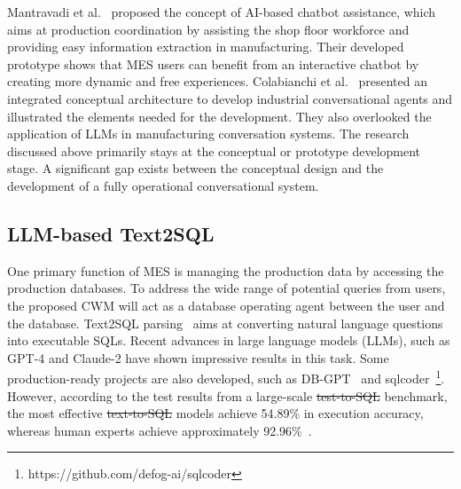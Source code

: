 \documentclass[preprint,12pt]{elsarticle}
\providecommand{\DIFaddtex}[1]{{\protect\color{blue}\uwave{#1}}} %
\providecommand{\DIFdeltex}[1]{{\protect\color{red}\sout{#1}}}                      %
\providecommand{\DIFaddbegin}{} %
\providecommand{\DIFaddend}{} %
\providecommand{\DIFdelbegin}{} %
\providecommand{\DIFdelend}{} %
\providecommand{\DIFadd}[1]{\texorpdfstring{\DIFaddtex{#1}}{#1}} %
\providecommand{\DIFdel}[1]{\texorpdfstring{\DIFdeltex{#1}}{}} %
\newcommand{\DIFscaledelfig}{0.5}
\newlength{\DIFdelgraphicswidth} %
\newlength{\DIFdelgraphicsheight} %
\newcommand{\DIFaddincludegraphics}[2][]{{\color{blue}\fbox{\DIFOincludegraphics[#1]{#2}}}} %
\newcommand{\DIFdelincludegraphics}[2][]{%
\sbox{\DIFdelgraphicsbox}{\DIFOincludegraphics[#1]{#2}}%
\settoboxwidth{\DIFdelgraphicswidth}{\DIFdelgraphicsbox} %
\settoboxtotalheight{\DIFdelgraphicsheight}{\DIFdelgraphicsbox} %
\scalebox{\DIFscaledelfig}{%
\parbox[b]{\DIFdelgraphicswidth}{\usebox{\DIFdelgraphicsbox}\\[-\baselineskip] \rule{\DIFdelgraphicswidth}{0em}}\llap{\resizebox{\DIFdelgraphicswidth}{\DIFdelgraphicsheight}{%
\setlength{\unitlength}{\DIFdelgraphicswidth}%
\begin{picture}(1,1)%
\thicklines\linethickness{2pt} %
{\color[rgb]{1,0,0}\put(0,0){\framebox(1,1){}}}%
{\color[rgb]{1,0,0}\put(0,0){\line( 1,1){1}}}%
{\color[rgb]{1,0,0}\put(0,1){\line(1,-1){1}}}%
\end{picture}%
}\hspace*{3pt}}} %
} %
\DeclareRobustCommand{\DIFaddbegin}{\DIFOaddbegin \let\includegraphics\DIFaddincludegraphics} %
\DeclareRobustCommand{\DIFaddend}{\DIFOaddend \let\includegraphics\DIFOincludegraphics} %
\DeclareRobustCommand{\DIFdelbegin}{\DIFOdelbegin \let\includegraphics\DIFdelincludegraphics} %
\DeclareRobustCommand{\DIFdelend}{\DIFOaddend \let\includegraphics\DIFOincludegraphics} %
\begin{document}
Mantravadi et al.~\cite{mantravadi2020user} proposed the concept of AI-based chatbot assistance, which aims at production coordination by assisting the shop floor workforce and providing easy information
extraction in manufacturing.
Their developed prototype shows that MES users can benefit from an interactive chatbot by creating more dynamic and free experiences.
Colabianchi et al.~\cite{colabianchi2023human} presented an integrated conceptual architecture to develop industrial conversational agents and illustrated the elements needed for the development. 
They also overlooked the application of LLMs in manufacturing conversation systems.
The research discussed above primarily stays at the conceptual or prototype development stage. 
A significant gap exists between the conceptual design and the development of a fully operational conversational system.

\subsection{LLM-based Text2SQL}
One primary function of MES is managing the production data by accessing the production databases. 
To address the wide range of potential queries from users, the proposed CWM will act as a database operating agent between the user and the database. 
Text2SQL parsing~\cite{li2024codes} aims at converting natural language questions into executable SQLs. 
Recent advances in large language models (LLMs), such as GPT-4 and Claude-2 have shown impressive results in this task. Some production-ready projects are also developed, such as DB-GPT~\cite{xue2023dbgpt} and sqlcoder~\footnote{https://github.com/defog-ai/sqlcoder}.
However, according to the test results from a large-scale \DIFdelbegin \DIFdel{test-to-SQL }\DIFdelend \DIFaddbegin \DIFadd{Text2SQL }\DIFaddend benchmark, the most effective \DIFdelbegin \DIFdel{text-to-SQL }\DIFdelend \DIFaddbegin \DIFadd{Text2SQL }\DIFaddend models achieve 54.89\% in execution accuracy, whereas human experts achieve approximately 92.96\%~\cite{li2024can}. 
\DIFaddbegin 
\end{document}
